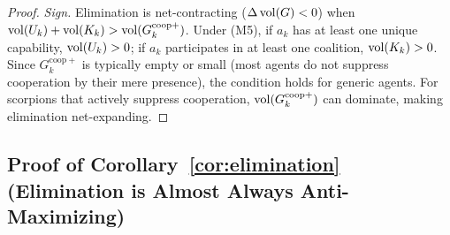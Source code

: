\begin{proof}
\emph{Sign.} Elimination is net-contracting ($\Delta \operatorname{vol}(G) < 0$) when
$\operatorname{vol}(U_k) + \operatorname{vol}(K_k) > \operatorname{vol}(G^{\mathrm{coop}+}_{k})$. Under (M5), if
$a_k$ has at least one unique capability, $\operatorname{vol}(U_k) > 0$; if $a_k$
participates in at least one coalition, $\operatorname{vol}(K_k) > 0$. Since
$G^{\mathrm{coop}+}_{k}$ is typically empty or small (most agents do not
suppress cooperation by their mere presence), the condition holds for generic
agents. For scorpions that actively suppress cooperation,
$\operatorname{vol}(G^{\mathrm{coop}+}_{k})$ can dominate, making elimination
net-expanding.
\end{proof}


\subsection{Proof of Corollary~\ref{cor:elimination} (Elimination is Almost Always Anti-Maximizing)}
\label{app:proof_elimination_cost}

